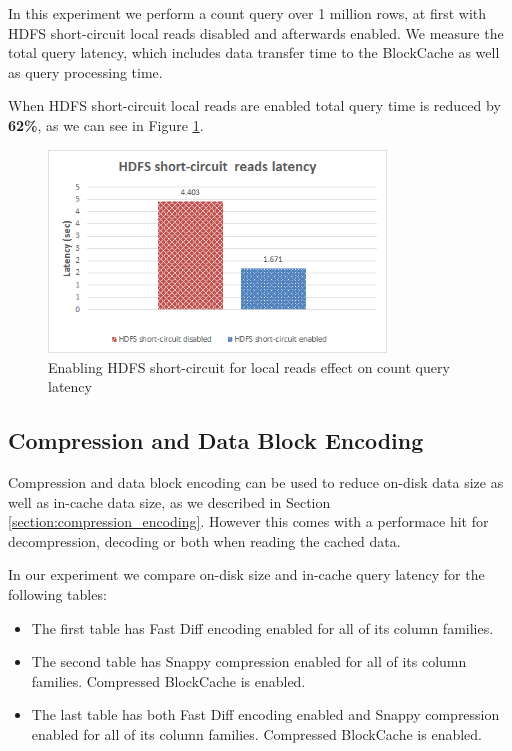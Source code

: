 In this experiment we perform a count query over 1 million rows, at first with HDFS short-circuit local reads disabled and afterwards enabled. We measure the total query latency, which includes data transfer time to the BlockCache as well as query processing time. 

When HDFS short-circuit local reads are enabled total query time is reduced by \textbf{62\%}, as we can see in Figure \ref{figure:benchmarks_hbase_short_circuit_latency}.

\begin{figure}[H]
\centering
\includegraphics[width=0.8\textwidth]{figures/benchmarks_hbase_short_circuit_latency}
\caption{Enabling HDFS short-circuit for local reads effect on count query latency}
\label{figure:benchmarks_hbase_short_circuit_latency}
\end{figure}

\subsection{Compression and Data Block Encoding}\label{subsection:benchmarks_compression_encoding}

Compression and data block encoding can be used to reduce on-disk data size as well as in-cache data size, as we described in Section \ref{section:compression_encoding}. However this comes with a performace hit for decompression, decoding or both when reading the cached data.

In our experiment we compare on-disk size and in-cache query latency for the following tables:
\begin{itemize}
\item The first table has Fast Diff encoding enabled for all of its column families.
\item The second table has Snappy compression enabled for all of its column families. Compressed BlockCache is enabled.
\item The last table has both Fast Diff encoding enabled and Snappy compression enabled for all of its column families. Compressed BlockCache is enabled.
\end{itemize}


